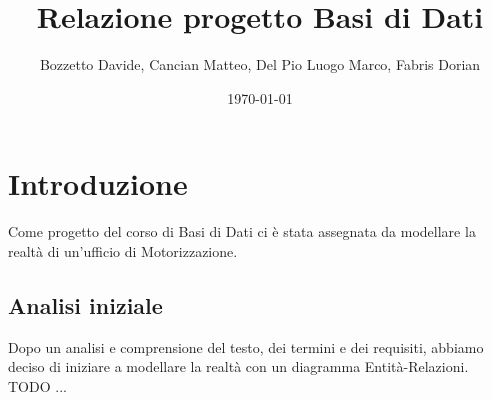 \documentclass{report} %
\title{Relazione progetto Basi di Dati} %
\author{Bozzetto Davide, Cancian Matteo, Del Pio Luogo Marco, Fabris Dorian} %
\date{\today} %
\begin{document}
\maketitle %

\section{Introduzione}
Come progetto del corso di Basi di Dati ci è stata assegnata da modellare la realtà di un'ufficio di Motorizzazione.

\subsection{Analisi iniziale}
Dopo un analisi e comprensione del testo, dei termini e dei requisiti, abbiamo deciso di iniziare a modellare la realtà con un diagramma Entità-Relazioni.
TODO ...
\end{document}

